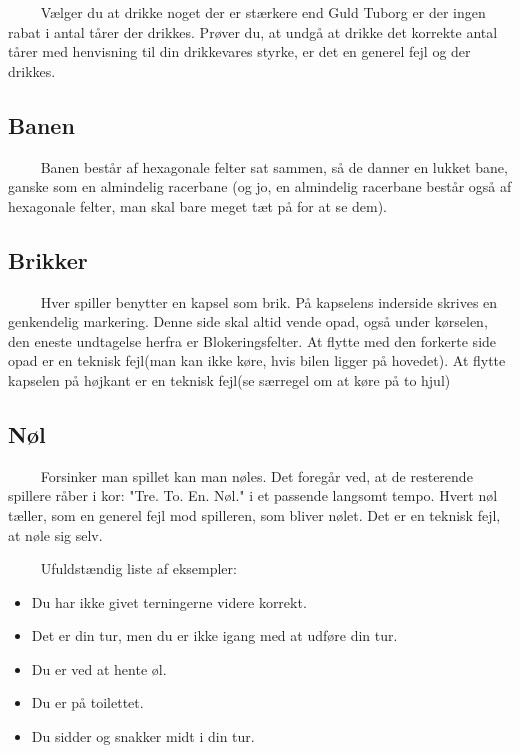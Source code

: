 \documentclass[12pt]{article}
\begin{document}
$\qquad$ Vælger du at drikke noget der er stærkere end Guld Tuborg er der ingen rabat i antal tårer der drikkes. Prøver du, at undgå at drikke det korrekte antal tårer med henvisning til din drikkevares styrke, er det en generel fejl og der drikkes.

\subsection*{Banen}

$\qquad$ Banen består af hexagonale felter sat sammen, så de danner en lukket bane, ganske som en almindelig racerbane (og jo, en almindelig racerbane består også af hexagonale felter, man skal bare meget tæt på for at se dem).

\subsection*{Brikker}

$\qquad$ Hver spiller benytter en kapsel som brik. På kapselens inderside skrives en genkendelig markering. Denne side skal altid vende opad, også under kørselen, den eneste undtagelse herfra er Blokeringsfelter. At flytte med den forkerte side opad er en teknisk fejl(man kan ikke køre, hvis bilen ligger på hovedet). At flytte kapselen på højkant er en teknisk fejl(se særregel om at køre på to hjul)

\subsection*{Nøl}

$\qquad$ Forsinker man spillet kan man nøles. Det foregår ved, at de resterende spillere råber i kor: "Tre. To. En. Nøl." i et passende langsomt tempo. Hvert nøl tæller, som en generel fejl mod spilleren, som bliver nølet. Det er en teknisk fejl, at nøle sig selv.

$\qquad$ Ufuldstændig liste af eksempler: 

\begin{itemize}
	\item Du har ikke givet terningerne videre korrekt.
	\item Det er din tur, men du er ikke igang med at udføre din tur.
	\item Du er ved at hente øl.
	\item Du er på toilettet.
	\item Du sidder og snakker midt i din tur.
\end{itemize}
\end{document}
